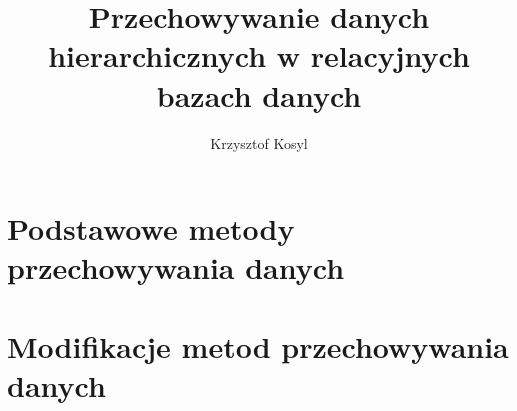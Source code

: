 \documentclass[12pt,a4paper,intlimits,oneside]{report}
\author{Krzysztof Kosyl}
\title{Przechowywanie danych hierarchicznych w relacyjnych bazach danych}
\begin{document}



\tableofcontents{}






\chapter{Podstawowe metody przechowywania danych}

	
	
	
	
	
	
	
	



\chapter{Modifikacje metod przechowywania danych}
\end{document}
